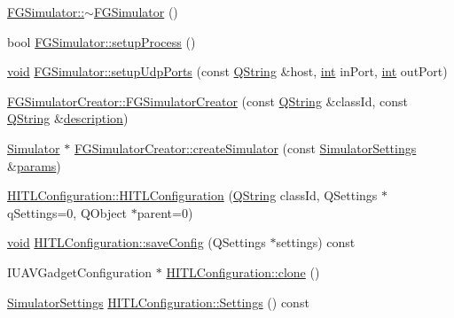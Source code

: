 \begin{DoxyCompactItemize}
\item 
\hyperlink{group___h_i_t_l_plugin_ga379c8b16215b0b40514c3b522fabf816}{F\-G\-Simulator\-::$\sim$\-F\-G\-Simulator} ()
\item 
bool \hyperlink{group___h_i_t_l_plugin_ga704da6f44b2b3538b2e1c3239cb2a76c}{F\-G\-Simulator\-::setup\-Process} ()
\item 
\hyperlink{group___u_a_v_objects_plugin_ga444cf2ff3f0ecbe028adce838d373f5c}{void} \hyperlink{group___h_i_t_l_plugin_ga806877c20e5dc15efd67bb1c5e4f0710}{F\-G\-Simulator\-::setup\-Udp\-Ports} (const \hyperlink{group___u_a_v_objects_plugin_gab9d252f49c333c94a72f97ce3105a32d}{Q\-String} \&host, \hyperlink{ioapi_8h_a787fa3cf048117ba7123753c1e74fcd6}{int} in\-Port, \hyperlink{ioapi_8h_a787fa3cf048117ba7123753c1e74fcd6}{int} out\-Port)
\item 
\hyperlink{group___h_i_t_l_plugin_ga5a9c061b4c449fceecb71b3e00412cd3}{F\-G\-Simulator\-Creator\-::\-F\-G\-Simulator\-Creator} (const \hyperlink{group___u_a_v_objects_plugin_gab9d252f49c333c94a72f97ce3105a32d}{Q\-String} \&class\-Id, const \hyperlink{group___u_a_v_objects_plugin_gab9d252f49c333c94a72f97ce3105a32d}{Q\-String} \&\hyperlink{sdlgamepad_8dox_ae82208d022e4246ddf1e4f481a3f81b0}{description})
\item 
\hyperlink{class_simulator}{Simulator} $\ast$ \hyperlink{group___h_i_t_l_plugin_gae7287ea22cde35ce9042e313d9d7c14f}{F\-G\-Simulator\-Creator\-::create\-Simulator} (const \hyperlink{group___h_i_t_l_plugin_ga052199f1328d3002bce3e45345aa7f4e}{Simulator\-Settings} \&\hyperlink{glext_8h_afeb6390ab3bc8a0e96a88aff34d52288}{params})
\item 
\hyperlink{group___h_i_t_l_plugin_ga7d0ecee89fe45b55113d77ae668a7777}{H\-I\-T\-L\-Configuration\-::\-H\-I\-T\-L\-Configuration} (\hyperlink{group___u_a_v_objects_plugin_gab9d252f49c333c94a72f97ce3105a32d}{Q\-String} class\-Id, Q\-Settings $\ast$q\-Settings=0, Q\-Object $\ast$parent=0)
\item 
\hyperlink{group___u_a_v_objects_plugin_ga444cf2ff3f0ecbe028adce838d373f5c}{void} \hyperlink{group___h_i_t_l_plugin_ga8ae31be95aaf6385511e9387aa0a49b3}{H\-I\-T\-L\-Configuration\-::save\-Config} (Q\-Settings $\ast$settings) const 
\item 
I\-U\-A\-V\-Gadget\-Configuration $\ast$ \hyperlink{group___h_i_t_l_plugin_gaf448a961e8785490a4dcc5187d7edbe6}{H\-I\-T\-L\-Configuration\-::clone} ()
\item 
\hyperlink{group___h_i_t_l_plugin_ga052199f1328d3002bce3e45345aa7f4e}{Simulator\-Settings} \hyperlink{group___h_i_t_l_plugin_ga993f772c2a086edf053d851849caa984}{H\-I\-T\-L\-Configuration\-::\-Settings} () const 

\end{DoxyCompactItemize}
